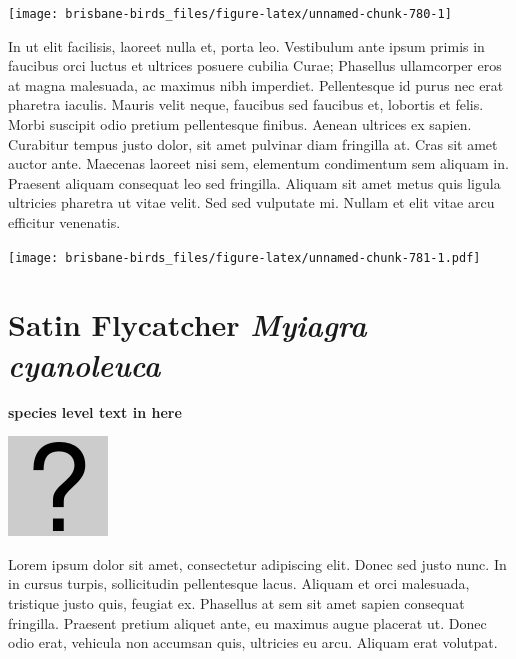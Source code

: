 \documentclass[]{book}
\let\origfigure\figure
\let\endorigfigure\endfigure
\renewenvironment{figure}[1][2] {
  \expandafter\origfigure\expandafter[H]
} {
  \endorigfigure
}
\begin{document}
\begin{figure}
\texttt{[image: brisbane-birds\_files/figure-latex/unnamed-chunk-780-1]} \caption{insert figure caption}\label{fig:unnamed-chunk-780}
\end{figure}

In ut elit facilisis, laoreet nulla et, porta leo. Vestibulum ante ipsum
primis in faucibus orci luctus et ultrices posuere cubilia Curae;
Phasellus ullamcorper eros at magna malesuada, ac maximus nibh
imperdiet. Pellentesque id purus nec erat pharetra iaculis. Mauris velit
neque, faucibus sed faucibus et, lobortis et felis. Morbi suscipit odio
pretium pellentesque finibus. Aenean ultrices ex sapien. Curabitur
tempus justo dolor, sit amet pulvinar diam fringilla at. Cras sit amet
auctor ante. Maecenas laoreet nisi sem, elementum condimentum sem
aliquam in. Praesent aliquam consequat leo sed fringilla. Aliquam sit
amet metus quis ligula ultricies pharetra ut vitae velit. Sed sed
vulputate mi. Nullam et elit vitae arcu efficitur venenatis.

\begin{figure}
\centering
\texttt{[image: brisbane-birds\_files/figure-latex/unnamed-chunk-781-1.pdf]}
\caption{\label{fig:unnamed-chunk-781}insert figure caption}
\end{figure}

\section{\texorpdfstring{Satin Flycatcher \emph{Myiagra
cyanoleuca}}{Satin Flycatcher Myiagra cyanoleuca}}\label{satin-flycatcher-myiagra-cyanoleuca}

\textbf{species level text in here}

\begin{figure}
\centering
\includegraphics{assets/missing.png}
\caption{No image for species}
\end{figure}

Lorem ipsum dolor sit amet, consectetur adipiscing elit. Donec sed justo
nunc. In in cursus turpis, sollicitudin pellentesque lacus. Aliquam et
orci malesuada, tristique justo quis, feugiat ex. Phasellus at sem sit
amet sapien consequat fringilla. Praesent pretium aliquet ante, eu
maximus augue placerat ut. Donec odio erat, vehicula non accumsan quis,
ultricies eu arcu. Aliquam erat volutpat.
\end{document}
